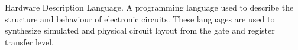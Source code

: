 \begin{definition}[HDL]
    Hardware Description Language. A programming language used to describe the structure and behaviour of electronic circuits. These languages are used to synthesize simulated and physical circuit layout from the gate and register transfer level\cite{Chu2006}.
\end{definition}
